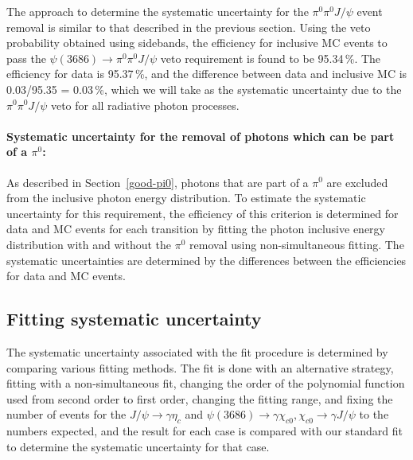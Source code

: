 \documentclass[aps,prd,twocolumn,showpacs,floatfix,byrevtex]{revtex4-1}
\begin{document}
The approach to determine the systematic uncertainty for the $\pi^0 \pi^0
J/\psi$ event removal is similar to that described in the previous section. 
Using the veto probability obtained using sidebands, the efficiency
for inclusive MC events to pass the $\psi(3686) \to \pi^0\pi^0 J/\psi$
veto requirement is found to be 95.34\,\%. %
The efficiency for data is 95.37\,\%, and the difference between data
and inclusive MC is 0.03/95.35 = 0.03\,\%, which we will take as the
systematic uncertainty due to the $\pi^0 \pi^0J/\psi$ veto for all
radiative photon processes. 


\paragraph*{\bf \boldmath Systematic uncertainty for the removal of
  photons which can be part of a $\pi^0$:\\}

As described in Section~\ref{good-pi0}, photons that are part of a
$\pi^0$ are excluded from the inclusive photon energy
distribution.  To estimate the systematic uncertainty for this requirement,
the efficiency of this criterion is determined for data and MC events for
each transition by fitting the photon inclusive energy distribution
with and without the $\pi^0$ removal using non-simultaneous
fitting. The systematic uncertainties are determined by the differences
between the efficiencies for data and MC events.

\subsection{Fitting systematic uncertainty}
\label{fitsys}

The systematic uncertainty associated with the fit procedure is
determined by comparing various fitting methods.  The fit is done with
an alternative strategy, fitting with a non-simultaneous fit, changing the
order of the polynomial function used from second order to first order,
changing the fitting range, and fixing the number of events for the
$J/\psi \to \gamma \eta_c$ and $\psi(3686) \to \gamma \chi_{c0},
\chi_{c0} \to \gamma J/\psi$ to the numbers expected, and the result
for each case is compared with our standard fit to determine the
systematic uncertainty for that case.
\end{document}

